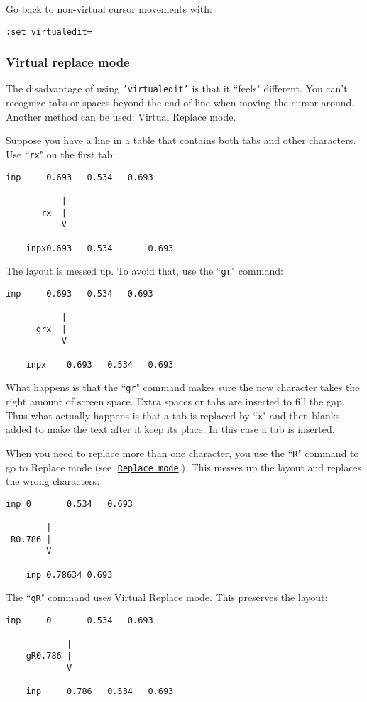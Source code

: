 Go back to non-virtual cursor movements with:

\begin{Verbatim}[samepage=true]
 :set virtualedit=
\end{Verbatim}

\subsubsection{Virtual replace mode}
The disadvantage of using \texttt{'virtualedit'} is that it ``feels" different.
You can't recognize tabs or spaces beyond the end of line when moving the cursor around.
Another method can be used: Virtual Replace mode.

Suppose you have a line in a table that contains both tabs and other characters.
Use ``\texttt{rx}" on the first tab:

\begin{Verbatim}[samepage=true]
    inp     0.693   0.534   0.693

           |
       rx  |
           V

    inpx0.693   0.534       0.693
\end{Verbatim}

The layout is messed up.
To avoid that, use the ``\texttt{gr}" command:

\begin{Verbatim}[samepage=true]
    inp     0.693   0.534   0.693

           |
      grx  |
           V

    inpx    0.693   0.534   0.693
\end{Verbatim}

What happens is that the ``\texttt{gr}" command makes sure the new character takes the right amount of screen space.
Extra spaces or tabs are inserted to fill the gap.
Thus what actually happens is that a tab is replaced by ``\texttt{x}" and then blanks added to make the text after it keep its place.
In this case a tab is inserted.

When you need to replace more than one character, you use the ``\texttt{R}" command to go to Replace mode (see |\hyperref[Replace mode]{\texttt{Replace mode}}|).
This messes up the layout and replaces the wrong characters:

\begin{Verbatim}[samepage=true]
    inp 0       0.534   0.693

        |
 R0.786 |
        V

    inp 0.78634 0.693
\end{Verbatim}

The ``\texttt{gR}" command uses Virtual Replace mode.
This preserves the layout:

\begin{Verbatim}[samepage=true]
    inp     0       0.534   0.693

            |
    gR0.786 |
            V

    inp     0.786   0.534   0.693
\end{Verbatim}

\clearpage
